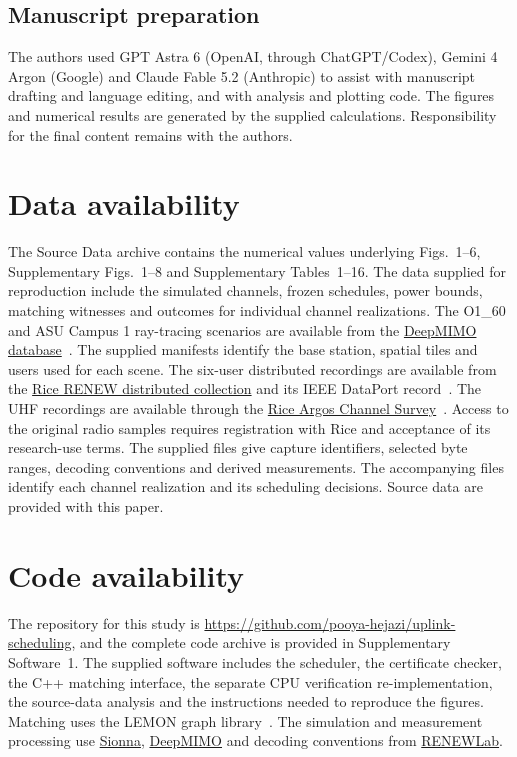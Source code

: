 \documentclass[lineno,pdflatex,sn-nature]{sn-jnl}
\begin{document}
\subsection*{Manuscript preparation}
The authors used GPT Astra 6 (OpenAI, through ChatGPT/Codex), Gemini 4 Argon (Google) and Claude Fable 5.2 (Anthropic) to assist with manuscript drafting and language editing, and with analysis and plotting code. The figures and numerical results are generated by the supplied calculations. Responsibility for the final content remains with the authors.

\section*{Data availability}
The Source Data archive contains the numerical values underlying Figs.~1--6, Supplementary Figs.~1--8 and Supplementary Tables~1--16. The data supplied for reproduction include the simulated channels, frozen schedules, power bounds, matching witnesses and outcomes for individual channel realizations. The O1\_60 and ASU Campus 1 ray-tracing scenarios are available from the \href{https://www.deepmimo.net/}{DeepMIMO database}~\cite{deepmimo}. The supplied manifests identify the base station, spatial tiles and users used for each scene. The six-user distributed recordings are available from the \href{https://renew-wireless.org/dataset-distributed.html}{Rice RENEW distributed collection} and its IEEE DataPort record~\cite{zafari}. The UHF recordings are available through the \href{https://renew-wireless.org/dataset-argos.html}{Rice Argos Channel Survey}~\cite{shepard}. Access to the original radio samples requires registration with Rice and acceptance of its research-use terms. The supplied files give capture identifiers, selected byte ranges, decoding conventions and derived measurements.
The accompanying files identify each channel realization and its scheduling decisions. Source data are provided with this paper.

\section*{Code availability}
The repository for this study is \url{https://github.com/pooya-hejazi/uplink-scheduling}, and the complete code archive is provided in Supplementary Software~1. The supplied software includes the scheduler, the certificate checker, the C++ matching interface, the separate CPU verification re-implementation, the source-data analysis and the instructions needed to reproduce the figures. Matching uses the LEMON graph library~\cite{lemon}. The simulation and measurement processing use \href{https://github.com/NVlabs/sionna}{Sionna}, \href{https://github.com/DeepMIMO/DeepMIMO}{DeepMIMO} and decoding conventions from \href{https://github.com/renew-wireless/RENEWLab}{RENEWLab}.
\end{document}

